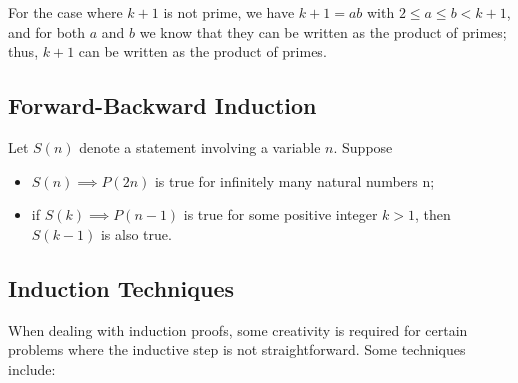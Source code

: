 For the case where \(k + 1\) is not prime, we have \(k + 1 = ab\) with \(2 \le a \le b < k + 1\), and
for both \(a\) and \(b\) we know that they can be written as the product of primes; thus,
\(k + 1\) can be written as the product of primes.

\QED

\subsection{Forward-Backward Induction}

Let \(S(n)\) denote a statement involving a variable \(n\). Suppose

\begin{itemize}

	\item \(S(n) \implies P(2n)\) is true for infinitely many natural numbers n;

	\item if \(S(k) \implies P(n - 1)\) is true for some positive integer \(k > 1\), then \(S(k - 1)\) is also true.

\end{itemize}

\subsection{Induction Techniques}

When dealing with induction proofs, some creativity is required for certain problems where the inductive step is not straightforward. Some techniques include:

